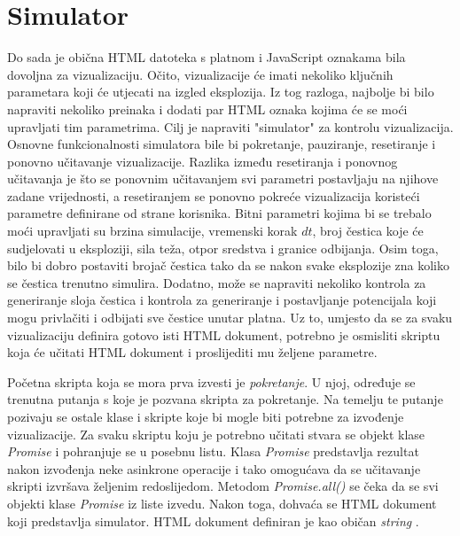 \documentclass{foi}
\begin{document}
\section{Simulator}
Do sada je obična HTML datoteka s platnom i JavaScript oznakama bila dovoljna za vizualizaciju. Očito, vizualizacije će imati nekoliko ključnih parametara koji će utjecati na izgled eksplozija. Iz tog razloga, najbolje bi bilo napraviti nekoliko preinaka i dodati par HTML oznaka kojima će se moći upravljati tim parametrima. Cilj je napraviti "simulator" za kontrolu vizualizacija. Osnovne funkcionalnosti simulatora bile bi pokretanje, pauziranje, resetiranje i ponovno učitavanje vizualizacije. Razlika između resetiranja i ponovnog učitavanja je što se ponovnim učitavanjem svi parametri postavljaju na njihove zadane vrijednosti, a resetiranjem se ponovno pokreće vizualizacija koristeći parametre definirane od strane korisnika. Bitni parametri kojima bi se trebalo moći upravljati su brzina simulacije, vremenski korak $dt$, broj čestica koje će sudjelovati u eksploziji, sila teža, otpor sredstva i granice odbijanja. Osim toga, bilo bi dobro postaviti brojač čestica tako da se nakon svake eksplozije zna koliko se čestica trenutno simulira. Dodatno, može se napraviti nekoliko kontrola za generiranje sloja čestica i kontrola za generiranje i postavljanje potencijala koji mogu privlačiti i odbijati sve čestice unutar platna. Uz to, umjesto da se za svaku vizualizaciju definira gotovo isti HTML dokument, potrebno je osmisliti skriptu koja će učitati HTML dokument i proslijediti mu željene parametre.

Početna skripta koja se mora prva izvesti je \textit{pokretanje}. U njoj, određuje se trenutna putanja s koje je pozvana skripta za pokretanje. Na temelju te putanje pozivaju se ostale klase i skripte koje bi mogle biti potrebne za izvođenje vizualizacije. Za svaku skriptu koju je potrebno učitati stvara se objekt klase \textit{Promise} i pohranjuje se u posebnu listu. Klasa \textit{Promise} predstavlja rezultat nakon izvođenja neke asinkrone operacije i tako omogućava da se učitavanje skripti izvršava željenim redoslijedom. Metodom \textit{Promise.all()} se čeka da se svi objekti klase \textit{Promise} iz liste izvedu. Nakon toga, dohvaća se HTML dokument koji predstavlja simulator. HTML dokument definiran je kao običan \textit{string} \parencite{PromiseFirefox}.
\end{document}
